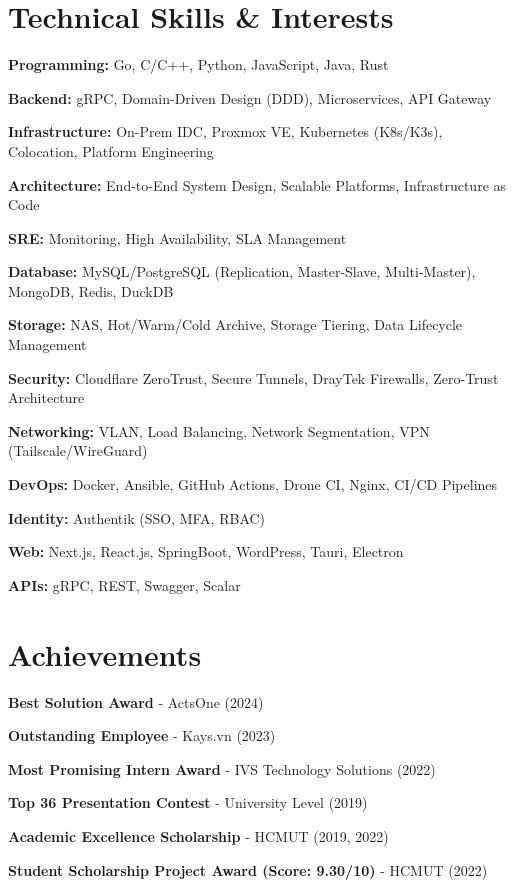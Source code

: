 \section{Technical Skills \& Interests}
\begin{onecolentry}
\begin{highlights}
    \item \textbf{Programming:} Go, C/C++, Python, JavaScript, Java, Rust
    \item \textbf{Backend:} gRPC, Domain-Driven Design (DDD), Microservices, API Gateway
    \item \textbf{Infrastructure:} On-Prem IDC, Proxmox VE, Kubernetes (K8s/K3s), Colocation, Platform Engineering
    \item \textbf{Architecture:} End-to-End System Design, Scalable Platforms, Infrastructure as Code
    \item \textbf{SRE:} Monitoring, High Availability, SLA Management
    \item \textbf{Database:} MySQL/PostgreSQL (Replication, Master-Slave, Multi-Master), MongoDB, Redis, DuckDB
    \item \textbf{Storage:} NAS, Hot/Warm/Cold Archive, Storage Tiering, Data Lifecycle Management
    \item \textbf{Security:} Cloudflare ZeroTrust, Secure Tunnels, DrayTek Firewalls, Zero-Trust Architecture
    \item \textbf{Networking:} VLAN, Load Balancing, Network Segmentation, VPN (Tailscale/WireGuard)
    \item \textbf{DevOps:} Docker, Ansible, GitHub Actions, Drone CI, Nginx, CI/CD Pipelines
    \item \textbf{Identity:} Authentik (SSO, MFA, RBAC)
    \item \textbf{Web:} Next.js, React.js, SpringBoot, WordPress, Tauri, Electron
    \item \textbf{APIs:} gRPC, REST, Swagger, Scalar
\end{highlights}
\end{onecolentry}

\section{Achievements}
\begin{onecolentry}
    \begin{highlights}
        \item \textbf{Best Solution Award} - ActsOne (2024)
        \item \textbf{Outstanding Employee} - Kays.vn (2023)
        \item \textbf{Most Promising Intern Award} - IVS Technology Solutions (2022)
        \item \textbf{Top 36 Presentation Contest} - University Level (2019)
        \item \textbf{Academic Excellence Scholarship} - HCMUT (2019, 2022)
        \item \textbf{Student Scholarship Project Award (Score: 9.30/10)} - HCMUT (2022)
    \end{highlights}
\end{onecolentry}
